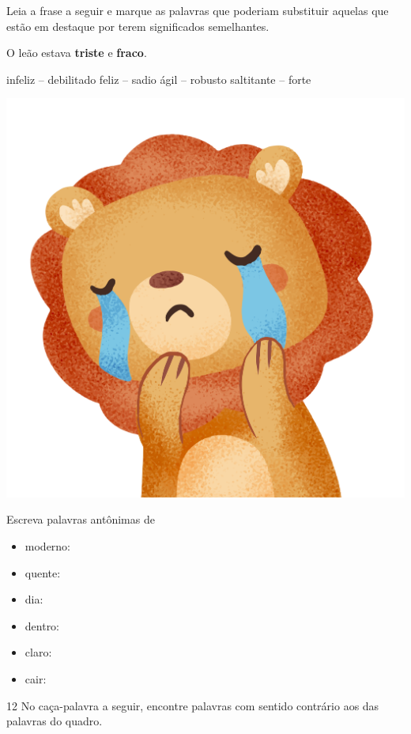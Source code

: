 \begin{escolha}[itemsep=-5pt]
\item Leia a frase a seguir e marque as palavras que poderiam substituir aquelas que estão em destaque por terem significados semelhantes.

O leão estava \textbf{triste} e \textbf{fraco}.

\begin{minipage}{.4\textwidth}
\begin{boxlist}
 infeliz -- debilitado
 feliz -- sadio
 ágil -- robusto
 saltitante -- forte
\end{boxlist}
\end{minipage}\vspace*{.5cm}
\begin{minipage}{.5\textwidth}
\includegraphics[width=.6\textwidth]{./media/image1c.png}
\end{minipage}

\item Escreva palavras antônimas de

\begin{itemize}
\item
  moderno: 
\item
  quente: 
\item
  dia: 
\item
  dentro: 
\item
  claro: 
\item
  cair: 
\end{itemize}
\end{escolha}

\pagebreak
\num{12} No caça-palavra a seguir, encontre palavras com sentido contrário aos das palavras do quadro.


